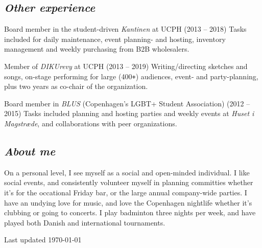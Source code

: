 \documentclass[10pt, a4paper]{article}
\begin{document}
\subsection*{\textit{Other experience}}
\begin{outline}
  \1 Board member in the student-driven \textit{Kantinen} at UCPH (2013 -- 2018)\newline
    {\footnotesize Tasks included for daily maintenance, event planning- and hosting, inventory management and weekly purchasing from B2B wholesalers.}

  \1 Member of \textit{DIKUrevy} at UCPH (2013 -- 2019)\newline
    {\footnotesize Writing/directing sketches and songs, on-stage performing for large (400\texttt{+}) audiences, event- and party-planning, plus two years as co-chair of the organization.}

  \1 Board member in \textit{BLUS} (Copenhagen's LGBT+ Student Association)  (2012 -- 2015)\newline
    {\footnotesize Tasks included planning and hosting parties and weekly events at \textit{Huset i Magstræde}, and collaborations with peer organizations.}
\end{outline}
\vspace*{\fill}
\subsection*{\textit{About me}}
On a personal level, I see myself as a social and open-minded individual.
I like social events, and consistently volunteer myself in planning committies whether it's for the occational Friday bar, or the large annual company-wide parties.
I have an undying love for music, and love the Copenhagen nightlife whether it's clubbing or going to concerts.
I play badminton three nights per week, and have played both Danish and international tournaments.
\vspace*{\fill}
\begin{flushright}
  Last updated \today
\end{flushright}
\end{document}
